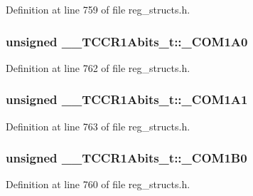 Definition at line 759 of file reg\+\_\+structs.\+h.

\hypertarget{union_____t_c_c_r1_abits__t_a1e4a4dac7814a51abf8d43337d8f2e4c}{
\subsubsection[{\+\_\+\+C\+O\+M1\+A0}]{\setlength{\rightskip}{0pt plus 5cm}unsigned \+\_\+\+\_\+\+T\+C\+C\+R1\+Abits\+\_\+t\+::\+\_\+\+C\+O\+M1\+A0}}\label{union_____t_c_c_r1_abits__t_a1e4a4dac7814a51abf8d43337d8f2e4c}


Definition at line 762 of file reg\+\_\+structs.\+h.

\hypertarget{union_____t_c_c_r1_abits__t_a6e736d233beb6247eca03b740a79cda4}{
\subsubsection[{\+\_\+\+C\+O\+M1\+A1}]{\setlength{\rightskip}{0pt plus 5cm}unsigned \+\_\+\+\_\+\+T\+C\+C\+R1\+Abits\+\_\+t\+::\+\_\+\+C\+O\+M1\+A1}}\label{union_____t_c_c_r1_abits__t_a6e736d233beb6247eca03b740a79cda4}


Definition at line 763 of file reg\+\_\+structs.\+h.

\hypertarget{union_____t_c_c_r1_abits__t_a51f09ffdaa59af8b23e1fa53b3bdac69}{
\subsubsection[{\+\_\+\+C\+O\+M1\+B0}]{\setlength{\rightskip}{0pt plus 5cm}unsigned \+\_\+\+\_\+\+T\+C\+C\+R1\+Abits\+\_\+t\+::\+\_\+\+C\+O\+M1\+B0}}\label{union_____t_c_c_r1_abits__t_a51f09ffdaa59af8b23e1fa53b3bdac69}


Definition at line 760 of file reg\+\_\+structs.\+h.

